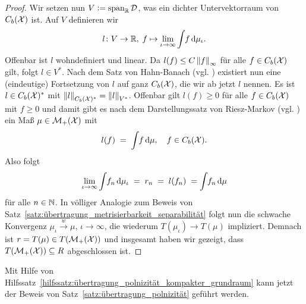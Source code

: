 \documentclass[../thesis/thesis.tex]{subfiles}
\begin{document}
\begin{proof}
		Wir setzen nun $V \vcentcolon = \mathrm{span}_{\mathbb{R}} \, \mathcal{D}$, was ein dichter Untervektorraum von $C_b(\mathcal{X})$ ist. Auf $V$ definieren wir
		\[ l \colon V \to \mathbb{R}, \; f \mapsto \lim_{\iota \to \infty} \int_{} \, f \, \mathrm{d}\mu_\iota  \text{.} \]
		Offenbar ist $l$ wohndefiniert und linear. Da $l(f) \leq C \left\lVert f\right\rVert_\infty$ für alle $f \in C_b(\mathcal{X})$ gilt, folgt $l \in V^\ast$. Nach dem Satz von Hahn-Banach (vgl. \cite[Corollary 5.5.2]{Simon.2015})
		existiert nun eine (eindeutige) Fortsetzung von $l$ auf ganz $C_b(\mathcal{X})$, die wir ab jetzt $l$ nennen. Es ist $l \in C_b(\mathcal{X})^\ast$ 
		mit $\left\lVert l\right\rVert_{C_b(\mathcal{X})^\ast} = \left\lVert l\right\rVert_{V^\ast}$. Offenbar gilt $l(f) \geq 0$ für alle $f \in C_b(\mathcal{X})$ mit $f \geq 0$ und damit gibt es 
		nach dem Darstellungssatz von Riesz-Markov (vgl. \cite[Theorem 4.8.8]{Simon.2015}) ein Maß $\mu \in \mathcal{M}_{+}(\mathcal{X})$ mit 
		\[ l(f) \; = \; \int_{} \, f \, \mathrm{d}\mu, \quad f \in C_b(\mathcal{X}) \text{.} \]
		Also folgt
		\[ \lim_{\iota \to \infty} \int_{} \, f_n \, \mathrm{d}\mu_\iota \; = \; r_n \; = \; l(f_n) \; = \int_{} \, f_n \, \mathrm{d}\mu \]
		für alle $n \in \mathbb{N}$. In völliger Analogie zum Beweis von Satz~\ref{satz:übertragung_metrisierbarkeit_separabilität} folgt nun die schwache Konvergenz $\mu_\iota \xrightarrow{w} \mu$, $\iota \to \infty$,
		die wiederum $T(\mu_\iota) \to T(\mu)$ impliziert. Demnach ist $r = T(\mu) \in T(\mathcal{M}_{+}(\mathcal{X}))$ und insgesamt haben wir gezeigt, dass $T(\mathcal{M}_{+}(\mathcal{X})) \subseteq R$ abgeschlossen ist.
	\end{proof}

	Mit Hilfe von Hilfssatz~\ref{hilfssatz:übertragung_polnizität_kompakter_grundraum} kann jetzt der Beweis von Satz~\ref{satz:übertragung_polnizität} geführt werden.
\end{document}
